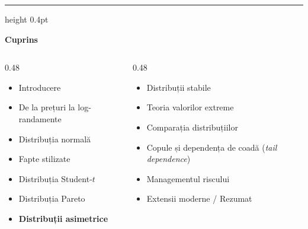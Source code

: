 \documentclass[9pt, aspectratio=169, t]{beamer}
\theoremstyle{definition}
\begin{document}
{
\begin{frame}{}
    {\color{FooterGray}\hrule height 0.4pt}
    \vspace{0.1cm}
    {\Large\textcolor{IDAred}{\textbf{Cuprins}}}
    \vspace{0.2cm}
    {\small
    \begin{columns}[T]
        \begin{column}{0.48\textwidth}
            \begin{itemize}
                \item Introducere \checkmark
                \item De la prețuri la log-randamente \checkmark
                \item Distribuția normală \checkmark
                \item Fapte stilizate \checkmark
                \item Distribuția Student-$t$ \checkmark
                \item Distribuția Pareto \checkmark
                \item \textbf{Distribuții asimetrice}
            \end{itemize}
        \end{column}
        \begin{column}{0.48\textwidth}
            \begin{itemize}
                \item Distribuții stabile
                \item Teoria valorilor extreme
                \item Comparația distribuțiilor
                \item Copule și dependența de coadă (\textit{tail dependence})
                \item Managementul riscului
                \item Extensii moderne / Rezumat
            \end{itemize}
        \end{column}
    \end{columns}
    }
\end{frame}
}
\end{document}
